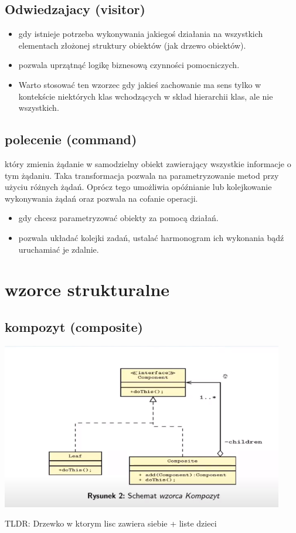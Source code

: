 \documentclass[11pt]{article}
\begin{document}
\subsection{Odwiedzajacy (visitor)}
\label{sec:orgc30128b}
\begin{itemize}
\item gdy istnieje potrzeba wykonywania jakiegoś działania na wszystkich elementach złożonej struktury obiektów (jak drzewo obiektów).
\item pozwala uprzątnąć logikę biznesową czynności pomocniczych.
\item Warto stosować ten wzorzec gdy jakieś zachowanie ma sens tylko w kontekście niektórych klas wchodzących w skład hierarchii klas, ale nie wszystkich.
\end{itemize}
\subsection{polecenie (command)}
\label{sec:org0a5286c}
który zmienia żądanie w samodzielny obiekt zawierający wszystkie informacje o tym żądaniu. Taka transformacja pozwala na parametryzowanie metod przy użyciu różnych żądań. Oprócz tego umożliwia opóźnianie lub kolejkowanie wykonywania żądań oraz pozwala na cofanie operacji.
\begin{itemize}
\item gdy chcesz parametryzować obiekty za pomocą działań.
\item pozwala układać kolejki zadań, ustalać harmonogram ich wykonania bądź uruchamiać je zdalnie.
\end{itemize}
\section{wzorce strukturalne}
\label{sec:org722227f}
\subsection{kompozyt (composite)}
\label{sec:org4749293}
\begin{center}
\includegraphics[width=.9\linewidth]{./kompozyt.png}
\end{center}
TLDR: Drzewko w ktorym lisc zawiera siebie + liste dzieci
\end{document}
